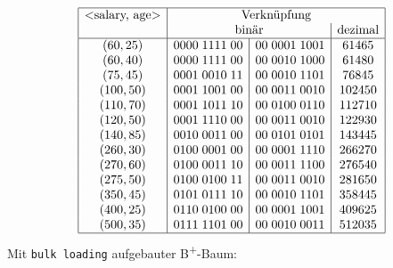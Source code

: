 \documentclass{uni_tue_template}
\newcommand{\code}[1]{\texttt{{\footnotesize #1}}}
\begin{document}
  \[\begin{array}{|c|c|c|c|}
  \hline
  $<salary, age>$ & \multicolumn{3}{c|}{$Verknüpfung$}\\
  & \multicolumn{2}{c|}{$binär$} & $dezimal$\\
  \hline
   (60,25) & 0000\;1111\;00 & 00\;0001\;1001 &  61465\\
   (60,40) & 0000\;1111\;00 & 00\;0010\;1000 &  61480\\
   (75,45) & 0001\;0010\;11 & 00\;0010\;1101 &  76845\\
  (100,50) & 0001\;1001\;00 & 00\;0011\;0010 & 102450\\
  (110,70) & 0001\;1011\;10 & 00\;0100\;0110 & 112710\\
  (120,50) & 0001\;1110\;00 & 00\;0011\;0010 & 122930\\
  (140,85) & 0010\;0011\;00 & 00\;0101\;0101 & 143445\\
  (260,30) & 0100\;0001\;00 & 00\;0001\;1110 & 266270\\
  (270,60) & 0100\;0011\;10 & 00\;0011\;1100 & 276540\\
  (275,50) & 0100\;0100\;11 & 00\;0011\;0010 & 281650\\
  (350,45) & 0101\;0111\;10 & 00\;0010\;1101 & 358445\\
  (400,25) & 0110\;0100\;00 & 00\;0001\;1001 & 409625\\
  (500,35) & 0111\;1101\;00 & 00\;0010\;0011 & 512035\\
  \hline
  \end{array}\]
  Mit \code{bulk loading} aufgebauter B\textsuperscript{+}-Baum:\\
  \vspace*{-1.4cm}\\
  \begin{center}
  \begin{sideways}
  \begin{small}
  \end{small}
  \end{sideways}
  \end{center}
\end{document}
